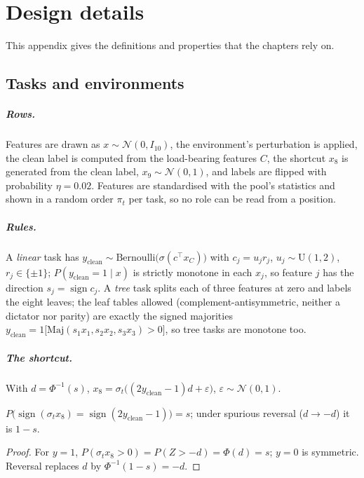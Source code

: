 \chapter{Design details}
\label{app:design}

This appendix gives the definitions and properties that the chapters rely on.

\section{Tasks and environments}

\paragraph{Rows.}
Features are drawn as $x \sim \mathcal{N}(0, I_{10})$, the environment's perturbation is applied, the clean label is computed from the load-bearing features $C$, the shortcut $x_8$ is generated from the clean label, $x_9 \sim \mathcal{N}(0,1)$, and labels are flipped with probability $\eta = 0.02$.
Features are standardised with the pool's statistics and shown in a random order $\pi_t$ per task, so no role can be read from a position.

\paragraph{Rules.}
A \emph{linear} task has $y_{\mathrm{clean}} \sim \mathrm{Bernoulli}\big(\sigma(c^\top x_C)\big)$ with $c_j = u_j r_j$, $u_j \sim \mathrm{U}(1,2)$, $r_j \in \{\pm 1\}$; $P(y_{\mathrm{clean}} = 1 \mid x)$ is strictly monotone in each $x_j$, so feature $j$ has the direction $s_j = \operatorname{sign} c_j$.
A \emph{tree} task splits each of three features at zero and labels the eight leaves; the leaf tables allowed (complement-antisymmetric, neither a dictator nor parity) are exactly the signed majorities $y_{\mathrm{clean}} = 1\big[\mathrm{Maj}(s_1 x_1, s_2 x_2, s_3 x_3) > 0\big]$, so tree tasks are monotone too.

\paragraph{The shortcut.}
With $d = \Phi^{-1}(s)$, $x_8 = \sigma_t\big((2y_{\mathrm{clean}} - 1)d + \varepsilon\big)$, $\varepsilon \sim \mathcal{N}(0,1)$.

\begin{proposition}
$P\big(\operatorname{sign}(\sigma_t x_8) = \operatorname{sign}(2y_{\mathrm{clean}}-1)\big) = s$; under spurious reversal ($d \to -d$) it is $1 - s$.
\end{proposition}
\begin{proof}
For $y = 1$, $P(\sigma_t x_8 > 0) = P(Z > -d) = \Phi(d) = s$; $y = 0$ is symmetric. Reversal replaces $d$ by $\Phi^{-1}(1-s) = -d$.
\end{proof}

